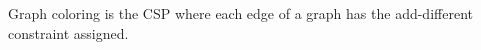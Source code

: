 \begin{example}

    Graph coloring is the CSP where each edge of a graph has the add-different constraint assigned.
\end{example}